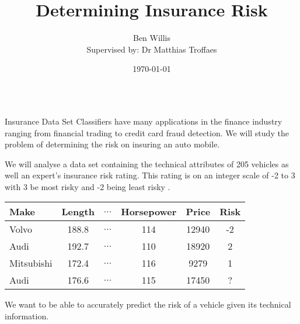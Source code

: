 \documentclass{beamer}
\title{Determining Insurance Risk}
\author[Ben Willis]{Ben Willis\\\normalsize{ Supervised by: Dr Matthias Troffaes}}
\institute{Durham University}
\date{\today}
\begin{document}
\begin{frame}
\begin{columns}
	\begin{column}{0.30\paperwidth}

		\begin{block}{Insurance Data Set}
			Classifiers have many applications in the finance industry ranging from financial trading to credit card fraud detection.
			We will study the problem of determining the risk on insuring an auto mobile. \vspace{0.5em}

			We will analyse a data set containing the technical attributes of 205 vehicles as well an expert's insurance risk rating.
			This rating is on an integer scale of -2 to 3 with 3 be most risky and -2 being least risky \cite{Automobile}.

			\begin{center}
				\begin{tabular}{l c c c c|c}
					Make       & Length & $\dots$ & Horsepower & Price & Risk \\
					\hline
					Volvo      & 188.8  & $\dots$ & 114        & 12940 & -2   \\
					Audi       & 192.7  & $\dots$ & 110        & 18920 & 2    \\
					Mitsubishi & 172.4  & $\dots$ & 116        & 9279  & 1    \\
					Audi       & 176.6  & $\dots$ & 115        & 17450 & ?
				\end{tabular}
			\end{center}

			We want to be able to accurately predict the risk of a vehicle given its technical information.
		\end{block}


\end{column}
\end{columns}
\end{frame}
\end{document}
